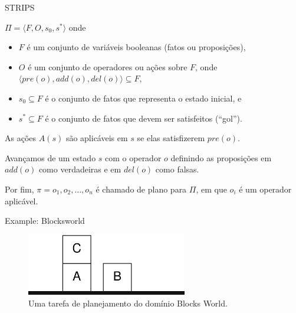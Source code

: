 \documentclass{beamer}
\begin{document}
\begin{frame}{STRIPS}
  \begin{definition}
    $\Pi = \langle F, O, s_{0}, s^{*}\rangle$ onde
    \begin{itemize}
        \item $F$ é um conjunto de variáveis booleanas (\alert{fatos ou proposições}),
        \item $O$ é um conjunto de \alert{operadores} ou ações sobre $F$, onde $\langle pre(o), add(o), del(o) \rangle \subseteq F$,
        \item $s_{0} \subseteq F$ é o conjunto de fatos que representa o \alert{estado inicial}, e
        \item $s^{*} \subseteq F$ é o conjunto de fatos que devem ser satisfeitos (``\alert{gol}'').
    \end{itemize}
   \pause
    As ações $A(s)$ são \alert{aplicáveis} em $s$ se elas satisfizerem $pre(o)$.

    Avançamos de um estado $s$ com o operador $o$ definindo as proposições em $add(o)$ como \alert{verdadeiras} e em $del(o)$ como \alert{falsas}.
    \pause

    Por fim, $\pi = o_{1}, o_{2},\ldots, o_{n}$ é chamado de \alert{plano} para $\Pi$, em que $o_{i}$ é um operador aplicável.
\end{definition}
\end{frame}

\begin{frame}{Example: Blocksworld} 
\begin{figure}
    \centering
    \includegraphics[width=7cm]{img/blocksworld1.png}
    \caption{Uma tarefa de planejamento do domínio Blocks World.}
\end{figure}
\end{frame}
\end{document}
